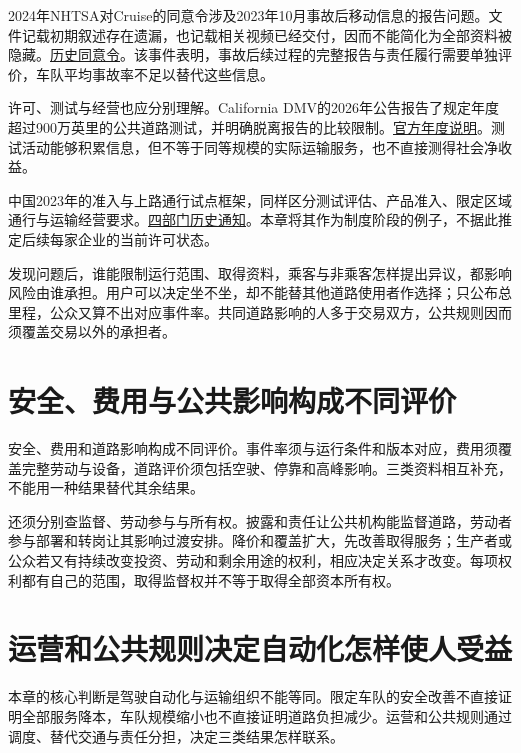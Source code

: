\documentclass[UTF8,fontset=windows,12pt,a4paper,oneside,openany]{ctexbook}
\begin{document}
2024年NHTSA对Cruise的同意令涉及2023年10月事故后移动信息的报告问题。文件记载初期叙述存在遗漏，也记载相关视频已经交付，因而不能简化为全部资料被隐藏。\href{https://www.nhtsa.gov/sites/nhtsa.gov/files/2024-09/cruise-consent-order-2024-web.pdf}{历史同意令}。该事件表明，事故后续过程的完整报告与责任履行需要单独评价，车队平均事故率不足以替代这些信息。

许可、测试与经营也应分别理解。California DMV的2026年公告报告了规定年度超过900万英里的公共道路测试，并明确脱离报告的比较限制。\href{https://www.dmv.ca.gov/portal/news-and-media/autonomous-vehicle-permit-holders-in-california-logged-more-than-9-million-test-miles-between-december-1-2024-and-november-30-2025/}{官方年度说明}。测试活动能够积累信息，但不等于同等规模的实际运输服务，也不直接测得社会净收益。

中国2023年的准入与上路通行试点框架，同样区分测试评估、产品准入、限定区域通行与运输经营要求。\href{https://ythxxfb.miit.gov.cn/ythzxfwpt/hlwmh/tzgg/xzxk/clsczr/art/2023/art_ae314a1df30e4ba1a49bd4ffa10186f6.html}{四部门历史通知}。本章将其作为制度阶段的例子，不据此推定后续每家企业的当前许可状态。

发现问题后，谁能限制运行范围、取得资料，乘客与非乘客怎样提出异议，都影响风险由谁承担。用户可以决定坐不坐，却不能替其他道路使用者作选择；只公布总里程，公众又算不出对应事件率。共同道路影响的人多于交易双方，公共规则因而须覆盖交易以外的承担者。

\section{安全、费用与公共影响构成不同评价}

安全、费用和道路影响构成不同评价。事件率须与运行条件和版本对应，费用须覆盖完整劳动与设备，道路评价须包括空驶、停靠和高峰影响。三类资料相互补充，不能用一种结果替代其余结果。



还须分别查监督、劳动参与与所有权。披露和责任让公共机构能监督道路，劳动者参与部署和转岗让其影响过渡安排。降价和覆盖扩大，先改善取得服务；生产者或公众若又有持续改变投资、劳动和剩余用途的权利，相应决定关系才改变。每项权利都有自己的范围，取得监督权并不等于取得全部资本所有权。

\section{运营和公共规则决定自动化怎样使人受益}

本章的核心判断是驾驶自动化与运输组织不能等同。限定车队的安全改善不直接证明全部服务降本，车队规模缩小也不直接证明道路负担减少。运营和公共规则通过调度、替代交通与责任分担，决定三类结果怎样联系。
\end{document}
